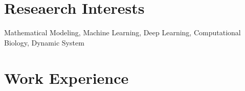 \documentclass[10pt, letterpaper]{article}
\newenvironment{highlightsforbulletentries}{
    \begin{itemize}[
        topsep=0.10 cm,
        parsep=0.10 cm,
        partopsep=0pt,
        itemsep=0pt,
        leftmargin=10pt
    ]
}{
    \end{itemize}
} %
\newenvironment{onecolentry}{
    \begin{adjustwidth}{
        0 cm + 0.00001 cm
    }{
        0 cm + 0.00001 cm
    }
}{
    \end{adjustwidth}
} %
\begin{document}
    









\vspace{0.15 cm}

            \section{Reseaerch Interests}
        Mathematical Modeling, Machine Learning, Deep Learning, Computational Biology, Dynamic System

\vspace{0.15 cm}


\section{Work Experience}



\vspace{0.2 cm}
\end{document}
